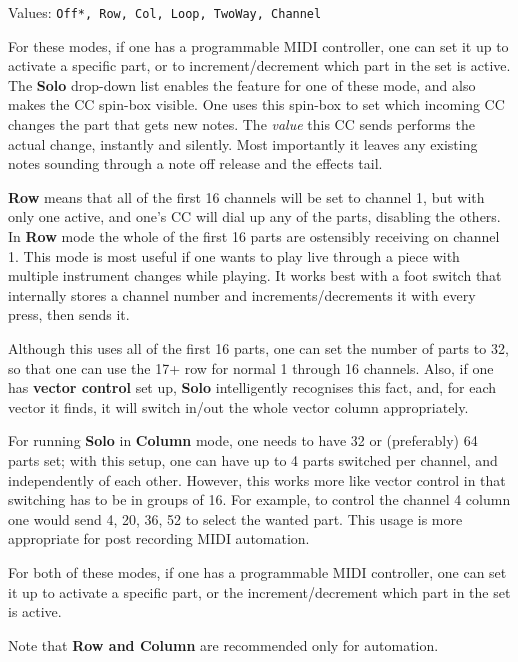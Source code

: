    Values: \texttt{Off*, Row, Col, Loop, TwoWay, Channel}

   For these modes, if one has a programmable MIDI controller, one can set it
   up to activate a specific part, or to increment/decrement which part in the
   set is active.  The \textbf{Solo} drop-down list enables the feature for
   one of these mode, and also makes the CC spin-box visible.
   One uses this spin-box to set which incoming CC changes the part that gets
   new notes.
   The \textsl{value} this CC sends performs the actual change, instantly and
   silently. Most importantly it leaves any existing notes sounding through a
   note off release and the effects tail.

   \textbf{Row} means that all of the first 16 channels will be set to channel
   1, but with only one active, and one's CC will dial up any of the parts,
   disabling the others.
   In \textbf{Row} mode the whole of the first 16 parts are ostensibly
   receiving on channel 1.  This mode is most useful if one wants to play live
   through a piece with multiple instrument changes while playing. It works
   best with a foot switch that internally stores a channel number and
   increments/decrements it with every press, then sends it.

   Although this uses all of the first 16 parts, one can set the number of
   parts to 32, so that one can use the 17+ row for normal 1 through 16
   channels. Also, if one has \textbf{vector control} set up, \textbf{Solo}
   intelligently recognises this fact, and, for each vector it finds, it will
   switch in/out the whole vector column appropriately.

   For running \textbf{Solo} in \textbf{Column} mode, one needs to have 32 or
   (preferably) 64 parts set; with this setup, one can have up to 4 parts
   switched per channel, and independently of each other. However, this works
   more like vector control in that switching has to be in groups of 16. For
   example, to control the channel 4 column one would send 4, 20, 36, 52 to
   select the wanted part. This usage is more appropriate for post recording
   MIDI automation.

   For both of these modes, if one has a programmable MIDI controller, one can
   set it up to activate a specific part, or the increment/decrement which part
   in the set is active.

   Note that \textbf{Row and Column} are recommended only for automation.

